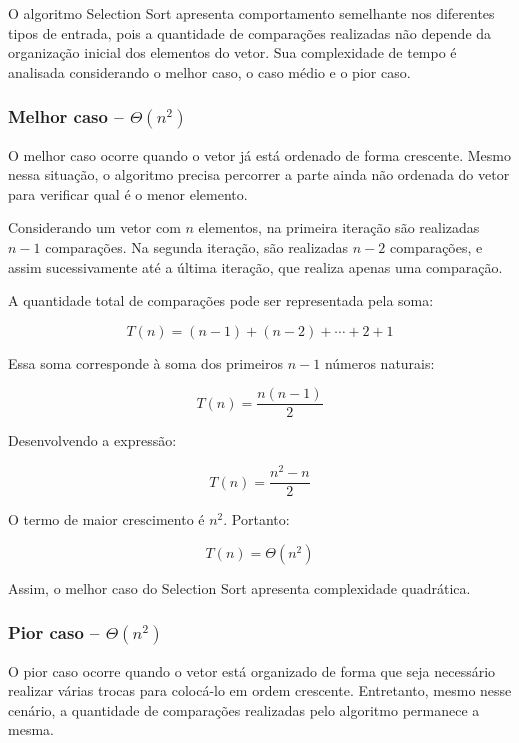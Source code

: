O algoritmo Selection Sort apresenta comportamento semelhante nos
diferentes tipos de entrada, pois a quantidade de comparações realizadas
não depende da organização inicial dos elementos do vetor. Sua complexidade
de tempo é analisada considerando o melhor caso, o caso médio e o pior caso.

\subsubsection{Melhor caso -- \texorpdfstring{$\Theta(n^2)$}{Theta(n²)}}

O melhor caso ocorre quando o vetor já está ordenado de forma crescente.
Mesmo nessa situação, o algoritmo precisa percorrer a parte ainda não
ordenada do vetor para verificar qual é o menor elemento.

Considerando um vetor com $n$ elementos, na primeira iteração são
realizadas $n-1$ comparações. Na segunda iteração, são realizadas $n-2$
comparações, e assim sucessivamente até a última iteração, que realiza
apenas uma comparação.

A quantidade total de comparações pode ser representada pela soma:

\begin{equation}
T(n) = (n-1) + (n-2) + \cdots + 2 + 1
\end{equation}

Essa soma corresponde à soma dos primeiros $n-1$ números naturais:

\begin{equation}
T(n) = \frac{n(n-1)}{2}
\end{equation}

Desenvolvendo a expressão:

\begin{equation}
T(n) = \frac{n^2-n}{2}
\end{equation}

O termo de maior crescimento é $n^2$. Portanto:

\begin{equation}
T(n) = \Theta(n^2)
\end{equation}

Assim, o melhor caso do Selection Sort apresenta complexidade
quadrática.

\subsubsection{Pior caso -- $\Theta(n^2)$}

O pior caso ocorre quando o vetor está organizado de forma que seja
necessário realizar várias trocas para colocá-lo em ordem crescente.
Entretanto, mesmo nesse cenário, a quantidade de comparações realizadas
pelo algoritmo permanece a mesma.

